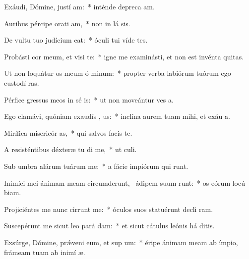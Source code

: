 \item Exáudi, Dómine, justí am:~* inténde depreca am.
\item Auribus pércipe orati am,~* non in lá sis.
\item De vultu tuo judícium  eat:~* óculi tui víde tes.
\item Probásti cor meum, et visi te:~* igne me examinásti, et non est invénta   quitas.
\item Ut non loquátur os meum ó minum:~* propter verba labiórum tuórum ego custodí  ras.
\item Pérfice gressus meos in sé is:~* ut non moveántur ves a.
\item Ego clamávi, quóniam exaudís , us:~* inclína aurem tuam mihi, et exáu  a.
\item Mirífica misericór as,~* qui salvos facis   te.
\item A resisténtibus déxteræ tu di me,~* ut  culi.
\item Sub umbra alárum tuárum  me:~* a fácie impiórum qui  runt.
\item Inimíci mei ánimam meam circumderunt,~\pscross{} ádipem suum runt:~* os eórum locú  biam.
\item Projiciéntes me nunc cirrunt me:~* óculos suos statuérunt decli  ram.
\item Suscepérunt me sicut leo pará  dam:~* et sicut cátulus leónis há  ditis.
\item Exsúrge, Dómine, prǽveni eum, et sup um:~* éripe ánimam meam ab ímpio, frámeam tuam ab inimí  æ.
